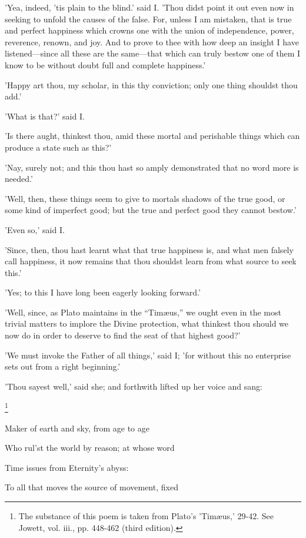 'Yea, indeed, 'tis plain to the blind.' said I. 'Thou didst point it out
even now in seeking to unfold the causes of the false. For, unless I am
mistaken, that is true and perfect happiness which crowns one with the
union of independence, power, reverence, renown, and joy. And to prove
to thee with how deep an insight I have listened—since all these are
the same—that which can truly bestow one of them I know to be without
doubt full and complete happiness.'

'Happy art thou, my scholar, in this thy conviction; only one thing
shouldst thou add.'

'What is that?' said I.

'Is there aught, thinkest thou, amid these mortal and perishable things
which can produce a state such as this?'

'Nay, surely not; and this thou hast so amply demonstrated that no word
more is needed.'

'Well, then, these things seem to give to mortals shadows of the true
good, or some kind of imperfect good; but the true and perfect good they
cannot bestow.'

'Even so,' said I.

'Since, then, thou hast learnt what that true happiness is, and what men
falsely call happiness, it now remains that thou shouldst learn from
what source to seek this.'

'Yes; to this I have long been eagerly looking forward.'

'Well, since, as Plato maintains in the ``Timæus,'' we ought even in the
most trivial matters to implore the Divine protection, what thinkest
thou should we now do in order to deserve to find the seat of that
highest good?'

'We must invoke the Father of all things,' said I; 'for without this no
enterprise sets out from a right beginning.'

'Thou sayest well,' said she; and forthwith lifted up her voice and
sang:


\footnote{The substance of this poem is taken from Plato's 'Timæus,'
29-42. See Jowett, vol. iii., pp. 448-462 (third edition).}

Maker of earth and sky, from age to age

Who rul'st the world by reason; at whose word

Time issues from Eternity's abyss:

To all that moves the source of movement, fixed

